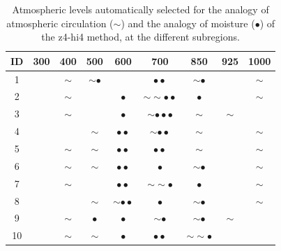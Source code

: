 \documentclass[5p]{elsarticle}
\begin{document}
\begin{table}[htbp]
	\caption{Atmospheric levels automatically selected for the analogy of atmospheric circulation ($\sim$) and the analogy of moisture ($\bullet$) of the z4-hi4 method, at the different subregions.}
	\footnotesize
	\begin{center}
		\begin{tabular}{ccccccccc}
			\hline ID & 300 & 400 & 500 & 600 & 700 & 850 & 925 & 1000 \\ 
			\hline 
			1  &   & $\sim$ & $\sim \bullet$ &   & $\bullet \bullet$ & $\sim \bullet$ &   & $\sim$ \\
			2  &   & $\sim$ &   & $\bullet$ & $\sim \sim \bullet \bullet$ & $\bullet$ &   & $\sim$ \\
			3  &   & $\sim$ &   & $\bullet$ & $\sim \bullet \bullet \bullet$ & $\sim$ & $\sim$ &   \\
			4  &   &   & $\sim$ & $\bullet \bullet$ & $\sim \bullet \bullet$ & $\sim$ &   & $\sim$ \\
			5  &   & $\sim$ & $\sim$ & $\bullet \bullet$ & $\bullet \bullet$ & $\sim$ &   & $\sim$ \\
			6  &   & $\sim$ & $\sim$ & $\bullet \bullet$ & $\bullet$ & $\sim \bullet$ &   & $\sim$ \\
			7  &   & $\sim$ &   & $\bullet \bullet$ & $\sim \sim \bullet$ & $\bullet$ &   & $\sim$ \\
			8  &   &   & $\sim$ & $\sim \bullet \bullet$ & $\bullet$ & $\sim \bullet$ &   & $\sim$ \\
			9  &   & $\sim$ &  $\bullet$ & $\bullet$ & $\sim \bullet$ & $\sim \bullet$ & $\sim$ &   \\
			10 &   & $\sim$ & $\sim$ & $\bullet$ & $\bullet \bullet$ & $\sim \sim \bullet$ &   &   \\
			\hline 
		\end{tabular} 
	\end{center}
	\label{table:levels_GA_z4_hi4}
\end{table}
\end{document}
